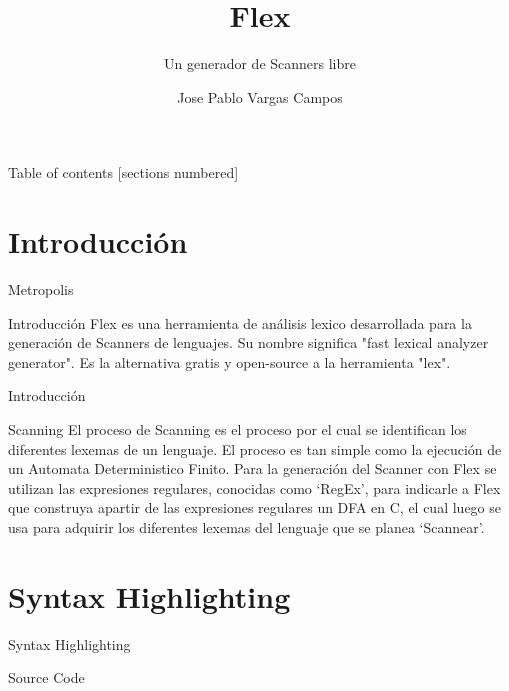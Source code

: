 \documentclass[10pt,xcolor={dvipsnames}]{beamer}
\title{Flex}
\subtitle{Un generador de Scanners libre}
\date{}
\author{Jose Pablo Vargas Campos \newline 2013116365}
\institute{Instituto Tecnológico de Costa Rica\newline Compiladores e Intérpretes \newline Semestre 2017 }
\begin{document}
\maketitle

\begin{frame}{Table of contents}
  [sections numbered]
  \tableofcontents[hideallsubsections]
\end{frame}

\section{Introducción}

\begin{frame}[fragile]{Metropolis}


\begin{alertblock}{Introducción}
		Flex es una herramienta de análisis lexico desarrollada para la generación de Scanners de lenguajes. Su nombre significa "fast lexical analyzer generator". Es la alternativa gratis y open-source a la herramienta "lex". 
\end{alertblock}
    
\end{frame}
    
\begin{frame}[fragile]{Introducción}

	\begin{alertblock}{Scanning}
		El proceso de Scanning es el proceso por el cual se identifican los diferentes lexemas de un lenguaje. El proceso es tan simple como la ejecución de un Automata Deterministico Finito. Para la generación del Scanner con Flex se utilizan las expresiones regulares, conocidas como `RegEx', para indicarle a Flex que construya apartir de las expresiones regulares un DFA en C, el cual luego se usa para adquirir los diferentes lexemas del lenguaje que se planea `Scannear'.

	\end{alertblock}

\end{frame}


\section{Syntax Highlighting}

\begin{frame}{Syntax Highlighting}
\begin{alertblock}{Source Code}
	\end{alertblock}
\end{frame}

\end{document}
